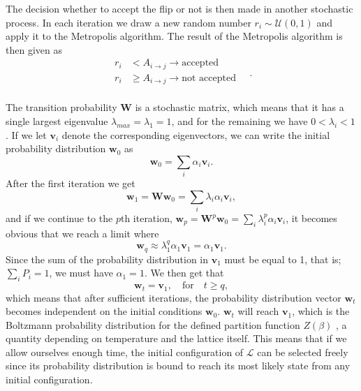 \documentclass[]{article}
\begin{document}
The decision whether to accept the flip or not is then made in another stochastic process. In each iteration we draw a new random  number $r_i \sim \mathcal{U}(0,1)$ and apply it to the Metropolis algorithm. The result of the Metropolis algorithm is then given as
\begin{equation} \label{eq:metropolis-accept-or-not}
\begin{aligned}
	r_i &< A_{i \rightarrow j} \rightarrow \text{accepted} \\
	r_i &\ge A_{i \rightarrow j} \rightarrow \text{not accepted} \\
\end{aligned} \quad.
\end{equation}

\vspace{5mm}

The transition probability $\mathbf{W}$ is a stochastic matrix, which means that it has a single largest eigenvalue $\lambda_{max} = \lambda_1 = 1$, and for the remaining we have $0 < \lambda_i < 1$ \cite{fys4150-notes}. If we let $\mathbf{v}_i$ denote the corresponding eigenvectors, we can write the initial probability distribution $\mathbf{w}_{0}$ as
\begin{equation} \label{eq:initial-state}
	\mathbf{w}_{0} = \sum_{i} \alpha_i \mathbf{v}_i.
\end{equation}
After the first iteration we get
\begin{equation}
	\mathbf{w}_{1} = \mathbf{W} \mathbf{w}_{0} = \sum_{i} \lambda_i \alpha_i \mathbf{v}_i,
\end{equation}
and if we continue to the $p$th iteration, $\mathbf{w}_{p} = \mathbf{W}^p \mathbf{w}_{0} = \sum_{i} \lambda_i^p \alpha_i \mathbf{v}_i$, it becomes obvious that we reach a limit where
\begin{equation}
	\mathbf{w}_{q} \approx \lambda_1^q \alpha_1 \mathbf{v}_1 = \alpha_1 \mathbf{v}_1.
\end{equation}
Since the sum of the probability distribution in $\mathbf{v}_1$ must be equal to 1, that is; $\sum_{i} P_i = 1$, we must have $\alpha_1 = 1$. We then get that
\begin{equation} \label{eq:steady-state}
	\mathbf{w}_{t} = \mathbf{v}_1, \quad \text{for} \quad t \ge q,
\end{equation}
which means that after sufficient iterations, the probability distribution vector $\mathbf{w}_{t}$ becomes independent on the initial conditions $\mathbf{w}_{0}$. $\mathbf{w}_{t}$ will reach $\mathbf{v}_1$, which is the Boltzmann probability distribution for the defined partition function $Z(\beta)$ \cite{newman1999monte}, a quantity depending on temperature and the lattice itself. This means that if we allow ourselves enough time, the initial configuration of $\mathcal{L}$ can be selected freely since its probability distribution is bound to reach its most likely state from any initial configuration.
\end{document}
